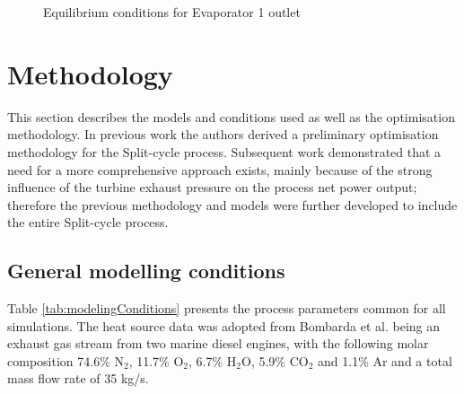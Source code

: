 \documentclass[review,3p]{elsarticle}
\begin{document}
\begin{figure}[htpb]
\centering
{}

\caption{Equilibrium conditions for Evaporator 1 outlet}
\label{fig:bubbleDew}
\end{figure}







\section{Methodology}
\label{sec:methodology}
This section describes the models and conditions used as well as the optimisation methodology. In previous work \cite{larsen2012} the authors derived a preliminary optimisation methodology for the Split-cycle process. Subsequent work demonstrated that a need for a more comprehensive approach exists, mainly because of the strong influence of the turbine exhaust pressure on the process net power output; therefore the previous methodology and models were further developed to include the entire Split-cycle process. 


\subsection{General modelling conditions}
Table \ref{tab:modelingConditions} presents the process parameters common for all simulations. The heat source data was adopted from Bombarda et al. \cite{Bombarda2010b} being an exhaust gas stream from two marine diesel engines, with the following molar composition 74.6\% N$_2$, 11.7\% O$_2$, 6.7\% H$_2$O, 5.9\% CO$_2$ and 1.1\% Ar and a total mass flow rate of 35 kg/s. 
\end{document}
